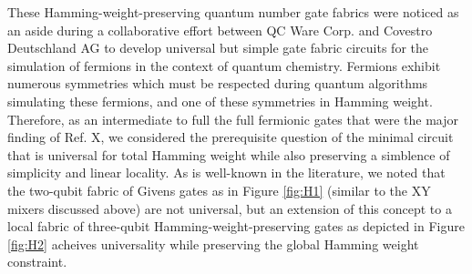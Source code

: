 \documentclass[aps,pra,twocolumn,superscriptaddress,groupedaddress]{revtex4}  %
\begin{document}
These Hamming-weight-preserving quantum number gate fabrics were noticed as an
aside during a collaborative effort between QC Ware Corp. and Covestro
Deutschland AG to develop universal but simple gate fabric circuits for the
simulation of fermions in the context of quantum chemistry. Fermions exhibit
numerous symmetries which must be respected during quantum algorithms simulating
these fermions, and one of these symmetries in Hamming weight. Therefore, as an
intermediate to full the full fermionic gates that were the major finding of
Ref. X, we considered the prerequisite question of the minimal circuit that is
universal for total Hamming weight while also preserving a simblence of
simplicity and linear locality. As is well-known in the literature, we noted
that the two-qubit fabric of Givens gates as in Figure \ref{fig:H1} (similar to
the XY mixers discussed above) are not universal, but an extension of this
concept to a local fabric of three-qubit Hamming-weight-preserving gates as
depicted in Figure \ref{fig:H2} acheives universality while preserving the
global Hamming weight constraint. 
\end{document}
